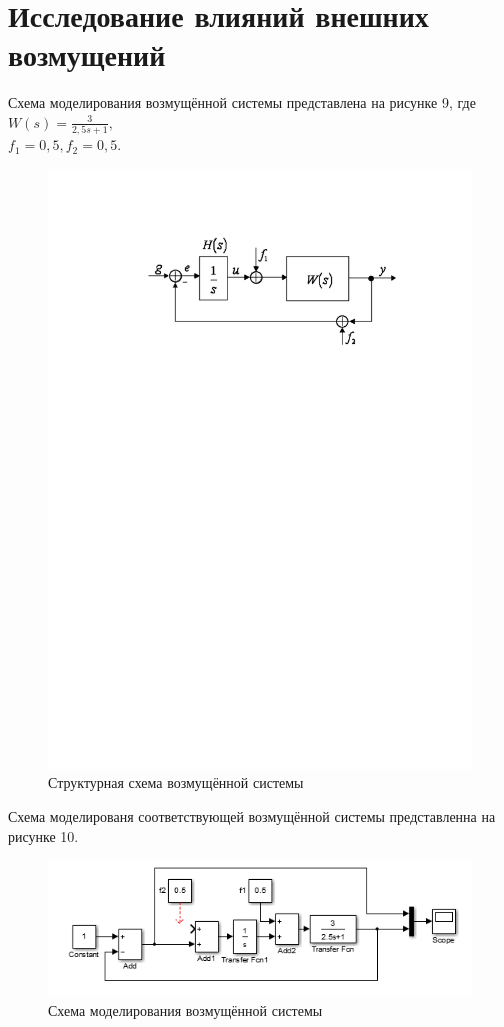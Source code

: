 \documentclass[a4paper, 11pt, russian]{article}
\begin{document}
    \section{Исследование влияний внешних возмущений}
    Схема моделирования возмущённой системы представлена на рисунке 9, где $W(s) = \displaystyle{\frac{3}{2,5s + 1}},$\\ $f_1 = 0,5, f_2 = 0,5.$\\
    \begin{figure}[ht!]
        \centering
        \includegraphics{disturbScheme}
        \caption{Структурная схема возмущённой системы}
    \end{figure}
    
    Схема моделированя соответствующей возмущённой системы представленна на рисунке 10.
    
    \begin{figure}[h!]
        \centering
        \includegraphics{dstScheme.PNG}
        \caption{Схема моделирования возмущённой системы}
    \end{figure}
    
\end{document}
